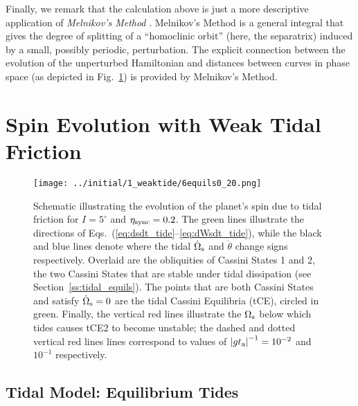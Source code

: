 \documentclass[
        fleqn,
        usenatbib,
    ]{mnras}
\newcommand*{\abs}[1]{\left|#1\right|}
\begin{document}
Finally, we remark that the calculation above is just a more descriptive
application of \emph{Melnikov's Method} \citep{g_and_h}. Melnikov's Method is a
general integral that gives the degree of splitting of a ``homoclinic orbit''
(here, the separatrix) induced by a small, possibly periodic, perturbation. The
explicit connection between the evolution of the unperturbed Hamiltonian and
distances between curves in phase space (as depicted in Fig.~\ref{fig:6equils})
is provided by Melnikov's Method.

\section{Spin Evolution with Weak Tidal Friction}\label{s:full_tide_prob}

\begin{figure}
    \centering
    \texttt{[image: ../initial/1\_weaktide/6equils0\_20.png]}
    \caption{Schematic illustrating the evolution of the planet's spin due to
    tidal friction for $I = 5^\circ$ and $\eta_{\rm sync} = 0.2$. The green
    lines illustrate the directions of
    Eqs.~(\ref{eq:dsdt_tide}--\ref{eq:dWsdt_tide}), while the black and blue
    lines denote where the tidal $\dot{\Omega}_{\rm s}$ and $\dot{\theta}$
    change signs respectively. Overlaid are the obliquities of Cassini States 1
    and 2, the two Cassini States that are stable under tidal dissipation (see
    Section~\ref{ss:tidal_equils}). The points that are both Cassini States and
    satisfy $\dot{\Omega}_{\rm s} = 0$ are the tidal Cassini Equilibria (tCE),
    circled in green. Finally, the vertical red lines illustrate the
    $\Omega_{\rm s}$ below which tides causes tCE2 to become unstable; the
    dashed and dotted vertical red lines lines correspond to values of $\abs{gt_{\rm
    a}}^{-1} = 10^{-2}$ and $10^{-1}$ respectively. }\label{fig:6equils}
\end{figure}

\subsection{Tidal Model: Equilibrium Tides}\label{ss:weaktide}
\end{document}

